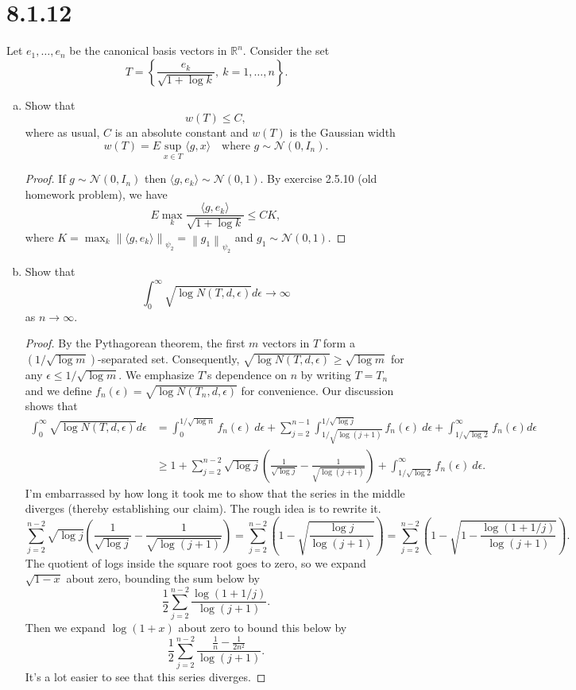\documentclass[11pt,letterpaper]{report}
\newcommand{\reals}{\mathbb{R}}
\newcommand{\mcal}[1]{\mathcal{#1}}
\newcommand{\subg}[1]{\left\|{#1}\right\|_{\psi_2}}
\begin{document}
\section*{8.1.12}
Let $e_1, \ldots, e_n$ be the canonical basis vectors in $\reals^n$. Consider the set
\[
T = \left\{\frac{e_k}{\sqrt{1+\log k}},\ k=1, \ldots, n\right\}.
\]
\begin{enumerate}[(a)]
	\item Show that
	\[
	w(T)\leq C,
	\]
	where as usual, $C$ is an absolute constant and $w(T)$ is the Gaussian width
	\[
	w(T) = E\sup_{x\in T}\langle g, x\rangle\quad\text{where }g\sim \mcal{N}(0, I_n).
	\]
	\begin{proof}
		If $g\sim \mcal{N}(0, I_n)$ then $\langle g, e_k\rangle \sim \mcal{N}(0, 1)$. By exercise 2.5.10 (old homework problem), we have
		\[
		E \max_k \frac{\langle g, e_k\rangle}{\sqrt{1+\log k}} \leq CK,
		\]
		where $K = \max_k\subg{\langle g, e_k\rangle} = \subg{g_1}$ and $g_1 \sim \mcal{N}(0, 1)$.
	\end{proof}


	\item Show that
	\[
	\int_0^\infty \sqrt{\log N(T, d, \epsilon)}d\epsilon\to \infty
	\]
	as $n\to \infty$.
	\begin{proof}
		By the Pythagorean theorem, the first $m$ vectors in $T$ form a $(1/\sqrt{\log m})$-separated set. Consequently, $\sqrt{\log N(T, d, \epsilon)} \geq \sqrt{\log m}$ for any $\epsilon \leq 1/\sqrt{\log m}$. We emphasize $T$'s dependence on $n$ by writing $T = T_n$ and we define $f_n(\epsilon) = \sqrt{\log N(T_n, d, \epsilon)}$ for convenience. Our discussion shows that
		\begin{align*}
			\int_0^\infty \sqrt{\log N(T, d, \epsilon)}d\epsilon &= \int_0^{1/\sqrt{\log n}}f_n(\epsilon)\ d\epsilon + \sum_{j=2}^{n-1}\int_{1/\sqrt{\log(j+1)}}^{1/\sqrt{\log j}}f_n(\epsilon)\ d\epsilon + \int_{1/\sqrt{\log 2}}^\infty f_n(\epsilon)d\epsilon\\
			&\geq 1 + \sum_{j=2}^{n-2}\sqrt{\log j}\left(\frac{1}{\sqrt{\log j}}-\frac{1}{\sqrt{\log(j+1)}}\right) + \int_{1/\sqrt{\log 2}}^\infty f_n(\epsilon)\ d\epsilon.
		\end{align*}
		I'm embarrassed by how long it took me to show that the series in the middle diverges (thereby establishing our claim). The rough idea is to rewrite it.
		\[
		\sum_{j=2}^{n-2}\sqrt{\log j}\left(\frac{1}{\sqrt{\log j}}-\frac{1}{\sqrt{\log(j+1)}}\right) = \sum_{j=2}^{n-2}\left(1-\sqrt{\frac{\log j}{\log (j+1)}}\right) = \sum_{j=2}^{n-2}\left(1-\sqrt{1-\frac{\log(1+1/j)}{\log (j+1)}}\right).
		\]
		The quotient of logs inside the square root goes to zero, so we expand $\sqrt{1-x}$ about zero, bounding the sum below by
		\[
		\frac{1}{2}\sum_{j=2}^{n-2}\frac{\log(1+1/j)}{\log(j+1)}.
		\]
		Then we expand $\log(1+x)$ about zero to bound this below by
		\[
		\frac{1}{2}\sum_{j=2}^{n-2}\frac{\frac{1}{n}-\frac{1}{2n^2}}{\log(j+1)}.
		\]
		It's a lot easier to see that this series diverges.
	\end{proof}
\end{enumerate}
\end{document}
